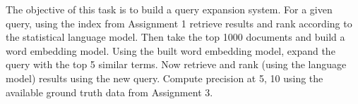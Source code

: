 \newcommand{\REM}[1]{}







\begin{hwproblem}

The objective of this task is to build a query expansion system. For a given query, using the index from Assignment 1 retrieve results and rank according to the statistical language model. Then take the top 1000 documents and build a word embedding model. Using the built word embedding model, expand the query with the top 5 similar terms. Now retrieve and rank (using the language model) results using the new query. Compute precision at 5, 10 using the available ground truth data from Assignment 3. 

 
\hwsolution{

}

\end{hwproblem}





